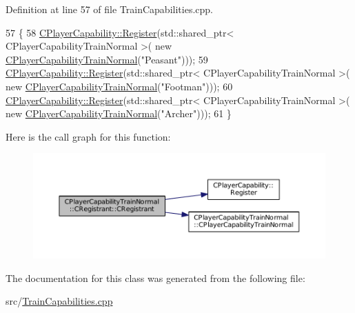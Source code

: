 Definition at line 57 of file Train\+Capabilities.\+cpp.


\begin{DoxyCode}
57                                                     \{
58     \hyperlink{classCPlayerCapability_a7e298018dcde2684451add3cfff065f7}{CPlayerCapability::Register}(std::shared\_ptr< CPlayerCapabilityTrainNormal >(\textcolor{keyword}{
      new} \hyperlink{classCPlayerCapabilityTrainNormal_a80b62a5131937c8230bf6229626dc53c}{CPlayerCapabilityTrainNormal}(\textcolor{stringliteral}{"Peasant"})));   
59     \hyperlink{classCPlayerCapability_a7e298018dcde2684451add3cfff065f7}{CPlayerCapability::Register}(std::shared\_ptr< CPlayerCapabilityTrainNormal >(\textcolor{keyword}{
      new} \hyperlink{classCPlayerCapabilityTrainNormal_a80b62a5131937c8230bf6229626dc53c}{CPlayerCapabilityTrainNormal}(\textcolor{stringliteral}{"Footman"})));
60     \hyperlink{classCPlayerCapability_a7e298018dcde2684451add3cfff065f7}{CPlayerCapability::Register}(std::shared\_ptr< CPlayerCapabilityTrainNormal >(\textcolor{keyword}{
      new} \hyperlink{classCPlayerCapabilityTrainNormal_a80b62a5131937c8230bf6229626dc53c}{CPlayerCapabilityTrainNormal}(\textcolor{stringliteral}{"Archer"})));   
61 \}
\end{DoxyCode}
Here is the call graph for this function\+:\nopagebreak
\begin{figure}[H]
\begin{center}
\leavevmode
\includegraphics[width=350pt]{classCPlayerCapabilityTrainNormal_1_1CRegistrant_a1ff86d5f61a1e9e5e2b9892ac8664848_cgraph}
\end{center}
\end{figure}


The documentation for this class was generated from the following file\+:\begin{DoxyCompactItemize}
\item 
src/\hyperlink{TrainCapabilities_8cpp}{Train\+Capabilities.\+cpp}\end{DoxyCompactItemize}
